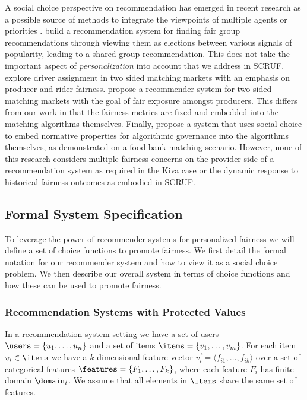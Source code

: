 A social choice perspective on recommendation has emerged in recent research as a possible source of methods to integrate the viewpoints of multiple agents  or priorities \cite{burke2020algorithmic}. \cite{chakraborty2019equality} build a recommendation system for finding fair group recommendations through viewing them as elections between various signals of popularity, leading to a shared group recommendation.  This does not take the important aspect of \emph{personalization} into account that we address in SCRUF.  \cite{suhr2019two} explore driver assignment in two sided matching markets with an emphasis on producer and rider fairness. \cite{patro2020fairrec} propose a recommender system for two-sided matching markets with the goal of fair exposure amongst producers.  This differs from our work in that the fairness metrics are fixed and embedded into the matching algorithms themselves.  Finally, \cite{lee2019webuildai} propose a system that uses social choice to embed normative properties for algorithmic governance into the algorithms themselves, as demonstrated on a food bank matching scenario. However, none of this research considers multiple fairness concerns on the provider side of a recommendation system as required in the Kiva case or the dynamic response to historical fairness outcomes as embodied in SCRUF.


\subsection{Formal System Specification}
To leverage the power of recommender systems for personalized fairness we will define a set of choice functions to promote fairness. We first detail the formal notation for our recommender system and how to view it as a social choice problem. We then describe our overall system in terms of choice functions and how these can be used to promote fairness.

\subsubsection{Recommendation Systems with Protected Values}
In a recommendation system setting we have a set of users $\users = \{u_1, \ldots, u_n\}$ and a set of items $\items = \{v_1, \ldots, v_m\}$. For each item $v_i \in \items$ we have a $k$-dimensional feature vector $\vec{v_i} = \langle f_{i1}, \ldots, f_{ik} \rangle$ over a set of categorical features $\features = \{F_1, \ldots, F_k\}$, where each feature $F_i$ has finite domain $\domain_i$. We assume that all elements in $\items$ share the same set of features. 

